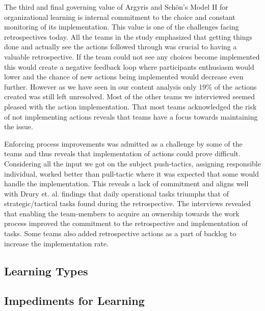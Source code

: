 The third and final governing value of Argyris and Schön's Model II for organizational learning is internal commitment to the choice and constant monitoring of its implementation. This value is one of the challenges facing retrospectives today. All the teams in the study emphasized that getting things done and actually see the actions followed through was crucial to having a valuable retrospective. If the team could not see any choices become implemented this would create a negative feedback loop where participants enthusiasm would lower and the chance of new actions being implemented would decrease even further. However as we have seen in our content analysis only 19\% of the actions created was still left unresolved. Most of the other teams we interviewed seemed pleased with the action implementation. That most teams acknowledged the risk of not implementing actions reveals that teams have a focus towards maintaining the issue. 

Enforcing process improvements was admitted as a challenge by some of the teams and thus reveals that implementation of actions could prove difficult. Considering all the input we got on the subject push-tactics, assigning responsible individual, worked better than pull-tactic where it was expected that some would handle the implementation. This reveals a lack of commitment and aligns well with Drury et. al. \cite{Drury2012} findings that daily operational tasks triumphs that of strategic/tactical tasks found during the retrospective. The interviews revealed that enabling the team-members to acquire an ownership towards the work process improved the commitment to the retrospective and implementation of tasks. Some teams also added retrospective actions as a part of backlog to increase the implementation rate. 

\subsection{Learning Types}
\label{discussion:learning-types}
\subsection{Impediments for Learning}
